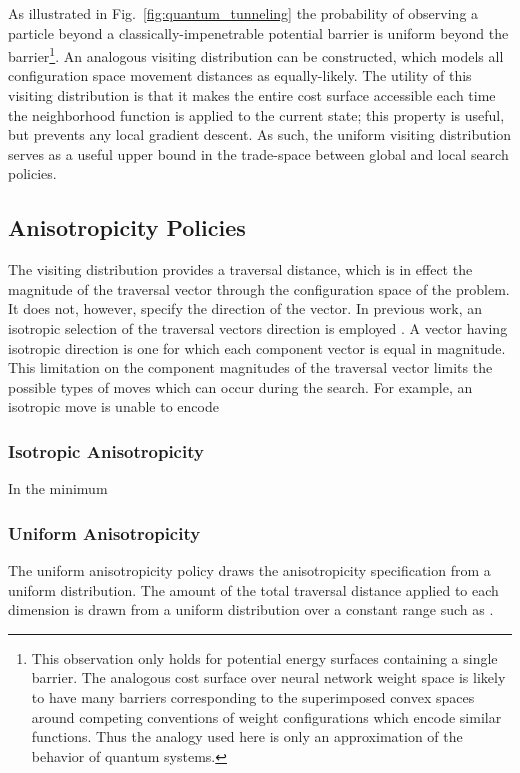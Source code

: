 \documentclass[11pt]{afthesis}
\begin{document}
	As illustrated in Fig.~\ref{fig:quantum_tunneling} the probability of observing a particle beyond a classically-impenetrable potential barrier is uniform beyond the barrier\footnote{This observation only holds for potential energy surfaces containing a single barrier. The analogous cost surface over neural network weight space is likely to have many barriers corresponding to the superimposed convex spaces around competing conventions of weight configurations which encode similar functions. Thus the analogy used here is only an approximation of the behavior of quantum systems.}. An analogous visiting distribution can be constructed, which models all configuration space movement distances as equally-likely. The utility of this visiting distribution is that it makes the entire cost surface accessible each time the neighborhood function is applied to the current state; this property is useful, but prevents any local gradient descent. As such, the uniform visiting distribution serves as a useful upper bound in the trade-space between global and local search policies. 
	
	\subsection{Anisotropicity Policies}
	
	The visiting distribution provides a traversal distance, which is in effect the magnitude of the traversal vector through the configuration space of the problem. It does not, however, specify the direction of the vector. In previous work, an isotropic selection of the traversal vectors direction is employed \cite{tsallis1996generalizedsimulatedannealing}. A vector having isotropic direction is one for which each component vector is equal in magnitude. This limitation on the component magnitudes of the traversal vector limits the possible types of moves which can occur during the search. For example, an isotropic move is unable to encode 
	
	\subsubsection{Isotropic Anisotropicity}
	
	In the minimum 
	
	
	\subsubsection{Uniform Anisotropicity}
	
	The uniform anisotropicity policy draws the anisotropicity specification from a uniform distribution. The amount of the total traversal distance applied to each dimension is drawn from a uniform distribution over a constant range such as \begin{math}[0,1]\end{math}.
	
\end{document}
